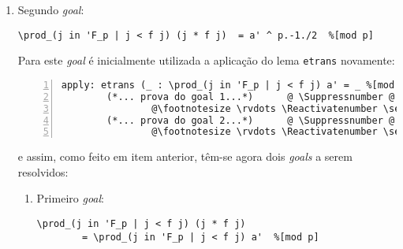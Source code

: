 \begin{enumerate}[label=\textbf{\roman*.}]
\begin{enumerate}[label=\textbf{\roman{enumi}.(\alph*)}]
\begin{enumerate}[listparindent=\parindent]
                        Este \textit{subgoal} aberto consiste em provar que o termo geral é sempre igual a 1 ou que as condições do produtório nunca serão atendidas (que é o caso desta prova) e portanto o produtório retorna apenas 1. 
                        
                        Após a prova deste \textit{subgoal} resta então apenas o segundo \textit{goal} gerado na aplicação da tática \lstinline[language=coq]|etrans| \cite{coq-ssrfun}.
                
                \end{enumerate}

                \item Segundo \textit{goal}:
        
                        \begin{lstlisting}[language=coq,frame=single,tabsize=1]
\prod_(j in 'F_p | j < f j) (j * f j)  = a' ^ p.-1./2  %[mod p]
                        \end{lstlisting}

                Para este \textit{goal} é inicialmente utilizada a aplicação do lema \lstinline[language=coq]|etrans| novamente:

                        \begin{lstlisting}[language=coq,frame=single, numbers=left,stepnumber=1,tabsize=1, escapechar=@, name=proof]
apply: etrans (_ : \prod_(j in 'F_p | j < f j) a' = _ %[mod p]).        @ \label{line:35-item4b} @    
        (*... prova do goal 1...*)      @ \Suppressnumber @
                @\footnotesize \rvdots \Reactivatenumber \setcounter{lstnumber}{39}@
        (*... prova do goal 2...*)      @ \Suppressnumber @
                @\footnotesize \rvdots \Reactivatenumber \setcounter{lstnumber}{35}@
                        \end{lstlisting}

                e assim, como feito em item anterior, têm-se agora dois \textit{goals} a serem resolvidos:
                
                \begin{enumerate}[label=\textbf{(\alph{enumii}.\arabic*)}]
                        
                        \item Primeiro \textit{goal}:
                
                        \begin{lstlisting}[language=coq,frame=single,tabsize=1]
\prod_(j in 'F_p | j < f j) (j * f j)  
        = \prod_(j in 'F_p | j < f j) a'  %[mod p]
                        \end{lstlisting}


\end{enumerate}
\end{enumerate}
\end{enumerate}
